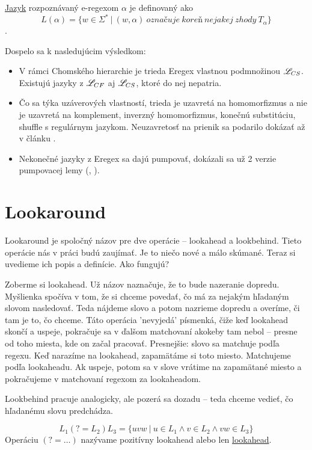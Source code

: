 \begin{df}
\underline{Jazyk} rozpoznávaný e-regexom $\alpha$ je definovaný ako
$$ L(\alpha) = \lbrace w \in \Sigma^* ~|~(w,\alpha ) ~označuje~koreň~nejakej~zhody~T_\alpha \rbrace $$.
\end{df}

Dospelo sa k nasledujúcim výsledkom:
\begin{itemize}
\item V rámci Chomského hierarchie je trieda Eregex vlastnou podmnožinou $\mathscr{L}_{CS}$. Existujú jazyky z $\mathscr{L}_{CF}$ aj $\mathscr{L}_{CS}$, ktoré do nej nepatria.
\item Čo sa týka uzáverových vlastností, trieda je uzavretá na homomorfizmus a nie je uzavretá na komplement, inverzný homomorfizmus, konečnú substitúciu, shuffle s regulárnym jazykom. Neuzavretosť na prienik sa podarilo dokázať až v článku \cite{ExtendedRegexIntersec}.
\item Nekonečné jazyky z Eregex sa dajú pumpovať, dokázali sa už 2 verzie pumpovacej lemy (\cite[Lemma 1]{ExtendedRegexPower}, \cite[Lemma 3]{ExtendedRegexIntersec}).
\end{itemize}

\section{Lookaround}
\label{dflookaround}

Lookaround je spoločný názov pre dve operácie -- lookahead a lookbehind. Tieto operácie nás v práci budú zaujímať. Je to niečo nové a málo skúmané. Teraz si uvedieme ich popis a definície. Ako fungujú? 

Zoberme si lookahead. Už názov naznačuje, že to bude nazeranie dopredu. Myšlienka spočíva v tom, že si chceme povedať, čo má za nejakým hľadaným slovom nasledovať. Teda nájdeme slovo a potom nazrieme dopredu a overíme, či tam je to, čo chceme. Táto operácia 'nevyjedá' písmenká, čiže keď lookahead skončí a uspeje, pokračuje sa v ďalšom matchovaní akokeby tam nebol -- presne od toho miesta, kde on začal pracovať. Presnejšie: slovo sa matchuje podľa regexu. Keď narazíme na lookahead, zapamätáme si toto miesto. Matchujeme podľa lookaheadu. Ak uspeje, potom sa v slove vrátime na zapamätané miesto a pokračujeme v matchovaní regexom za lookaheadom\cite{Python3Documentation}.

Lookbehind pracuje analogicky, ale pozerá sa dozadu -- teda chceme vedieť, čo hľadanému slovu predchádza. 

\begin{df}
$$ L_{1}(?=L_{2})L_{3} = \lbrace uvw ~|~ u \in L_{1} \land v \in L_{2} \land vw \in L_{3} \rbrace $$ Operáciu $(?=\dots)$ nazývame pozitívny lookahead alebo len \underline{lookahead}.
\end{df}

